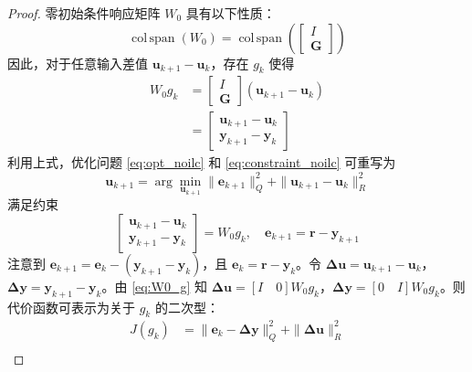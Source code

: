 \begin{proof}
	零初始条件响应矩阵 \( W_0 \) 具有以下性质：
	\begin{equation}
		\operatorname{col\,span}(W_0) = \operatorname{col\,span}\left( \begin{bmatrix} I \\ \mathbf{G} \end{bmatrix} \right)
		\label{eq:W0_property}
	\end{equation}
	因此，对于任意输入差值 \( \mathbf{u}_{k+1} - \mathbf{u}_k \)，存在 \( g_k \) 使得
	\begin{equation}
		\begin{aligned}
			W_0 g_k &= \begin{bmatrix} I \\ \mathbf{G} \end{bmatrix} (\mathbf{u}_{k+1} - \mathbf{u}_k) \\
			&= \begin{bmatrix} \mathbf{u}_{k+1} - \mathbf{u}_k \\ \mathbf{y}_{k+1} - \mathbf{y}_k \end{bmatrix}
		\end{aligned}
		\label{eq:W0_g}
	\end{equation}
	利用上式，优化问题 \eqref{eq:opt_noilc} 和 \eqref{eq:constraint_noilc} 可重写为
	\begin{equation}
		\mathbf{u}_{k+1} = \arg \min_{\mathbf{u}_{k+1}} \| \mathbf{e}_{k+1} \|_Q^2 + \| \mathbf{u}_{k+1} - \mathbf{u}_k \|_R^2
	\end{equation}
	满足约束
	\begin{equation}
		\begin{bmatrix} \mathbf{u}_{k+1} - \mathbf{u}_k \\ \mathbf{y}_{k+1} - \mathbf{y}_k \end{bmatrix} = W_0 g_k, \quad \mathbf{e}_{k+1} = \mathbf{r} - \mathbf{y}_{k+1}
		\label{eq:constrained_opt}
	\end{equation}
	注意到 \( \mathbf{e}_{k+1} = \mathbf{e}_k - (\mathbf{y}_{k+1} - \mathbf{y}_k) \)，且 \( \mathbf{e}_k = \mathbf{r} - \mathbf{y}_k \)。令 \( \mathbf{\Delta u} = \mathbf{u}_{k+1} - \mathbf{u}_k \)，\( \mathbf{\Delta y} = \mathbf{y}_{k+1} - \mathbf{y}_k \)。由 \eqref{eq:W0_g} 知 \( \mathbf{\Delta u} = [I \quad 0] W_0 g_k \)，\( \mathbf{\Delta y} = [0 \quad I] W_0 g_k \)。则代价函数可表示为关于 \( g_k \) 的二次型：
	\begin{align*}
		J(g_k) &= \| \mathbf{e}_k - \mathbf{\Delta y} \|_Q^2 + \| \mathbf{\Delta u} \|_R^2 \\

\end{align*}
\end{proof}
